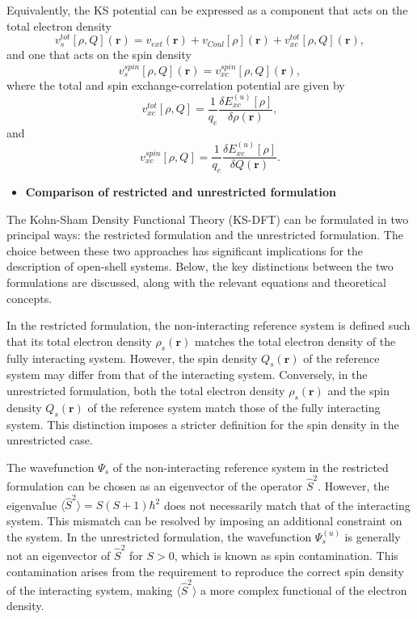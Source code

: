 \documentclass[%
 preprint, linenumbers,
 amsmath,amssymb,
 aps, physrev,
]{revtex4-2}
\begin{document}
Equivalently, the KS potential can be expressed as a component that acts on the total electron density
\begin{equation}
    v_s^{tot}[\rho, Q](\mathbf{r}) = v_{ext}(\mathbf{r}) + v_{Coul}[\rho](\mathbf{r}) + v_{xc}^{tot}[\rho,Q](\mathbf{r}),
\end{equation}
and one that acts on the spin density
\begin{equation}
    v_s^{spin}[\rho, Q](\mathbf{r}) = v_{xc}^{spin}[\rho, Q](\mathbf{r}),
\end{equation}
where the total and spin exchange-correlation potential are given by
\begin{equation}
    v_{xc}^{tot}[\rho, Q] = \frac{1}{q_e}\frac{\delta E_{xc}^{(u)}[\rho]}{\delta \rho(\mathbf{r})},
\end{equation}
and
\begin{equation}
    v_{xc}^{spin}[\rho, Q] = \frac{1}{q_e}\frac{\delta E_{xc}^{(u)}[\rho]}{\delta Q(\mathbf{r})}.
\end{equation}

\begin{itemize}
    \item \textbf{ Comparison of restricted and unrestricted
    formulation}
\end{itemize}
The Kohn-Sham Density Functional Theory (KS-DFT) can be formulated in two principal ways: the restricted formulation and the unrestricted formulation. The choice between these two approaches has significant implications for the description of open-shell systems. Below, the key distinctions between the two formulations are discussed, along with the relevant equations and theoretical concepts.

In the restricted formulation, the non-interacting reference system is defined such that its total electron density \(\rho_s(\mathbf{r})\) matches the total electron density of the fully interacting system. However, the spin density \(Q_s(\mathbf{r})\) of the reference system may differ from that of the interacting system. Conversely, in the unrestricted formulation, both the total electron density \(\rho_s(\mathbf{r})\) and the spin density \(Q_s(\mathbf{r})\) of the reference system match those of the fully interacting system. This distinction imposes a stricter definition for the spin density in the unrestricted case.

The wavefunction \(\Psi_s\) of the non-interacting reference system in the restricted formulation can be chosen as an eigenvector of the operator \(\hat{S}^2\). However, the eigenvalue \(\langle \hat{S}^2 \rangle = S(S+1) \hbar^2\) does not necessarily match that of the interacting system. This mismatch can be resolved by imposing an additional constraint on the system. In the unrestricted formulation, the wavefunction \(\Psi_s^{(u)}\) is generally not an eigenvector of \(\hat{S}^2\) for \(S > 0\), which is known as spin contamination. This contamination arises from the requirement to reproduce the correct spin density of the interacting system, making \(\langle \hat{S}^2 \rangle\) a more complex functional of the electron density.
\end{document}
